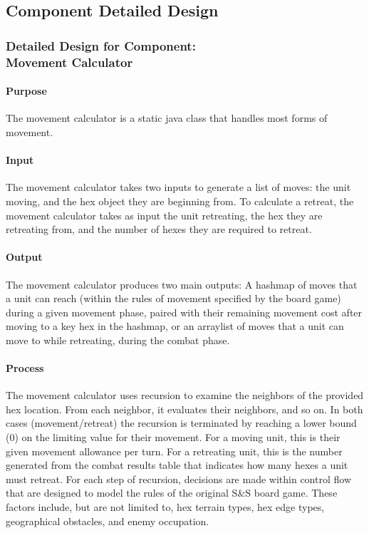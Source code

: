 \documentclass[12pt,a4paper]{article}
\begin{document}
	\subsection{Component Detailed Design}
		\subsubsection{Detailed Design for Component:\\Movement Calculator}
			\paragraph{Purpose} The movement calculator is a static java class that handles most forms of movement. 
			\paragraph{Input} The movement calculator takes two inputs to generate a list of moves: the unit moving, and the hex object they are beginning from. To calculate a retreat, the movement calculator takes as input the unit retreating, the hex they are retreating from, and the number of hexes they are required to retreat.
			\paragraph{Output} The movement calculator produces two main outputs: A hashmap of moves that a unit can reach (within the rules of movement specified by the board game) during a given movement phase, paired with their remaining movement cost after moving to a key hex in the hashmap, or an arraylist of moves that a unit can move to while retreating, during the combat phase.
			\paragraph{Process} The movement calculator uses recursion to examine the neighbors of the provided hex location. From each neighbor, it evaluates their neighbors, and so on. In both cases (movement/retreat) the recursion is terminated by reaching a lower bound (0) on the limiting value for their movement. For a moving unit, this is their given movement allowance per turn. For a retreating unit, this is the number generated from the combat results table that indicates how many hexes a unit must retreat. For each step of recursion, decisions are made within control flow that are designed to model the rules of the original S\&S board game. These factors include, but are not limited to, hex terrain types, hex edge types, geographical obstacles, and enemy occupation. 
\end{document}
